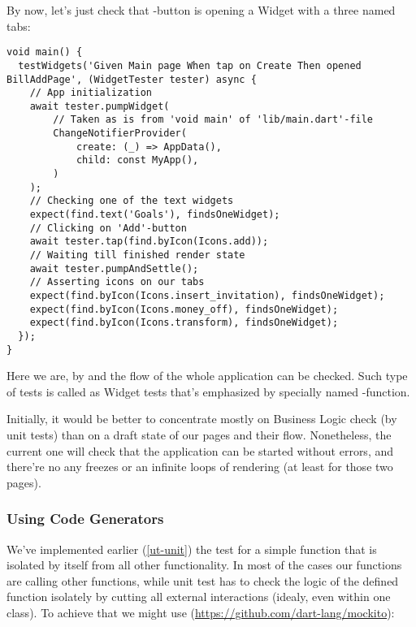\noindent By now, let's just check that -button is opening a Widget with a three named tabs:

\begin{lstlisting}
void main() {
  testWidgets('Given Main page When tap on Create Then opened BillAddPage', (WidgetTester tester) async {
    // App initialization
    await tester.pumpWidget(
        // Taken as is from 'void main' of 'lib/main.dart'-file
        ChangeNotifierProvider(
            create: (_) => AppData(),
            child: const MyApp(),
        )
    );
    // Checking one of the text widgets
    expect(find.text('Goals'), findsOneWidget);
    // Clicking on 'Add'-button
    await tester.tap(find.byIcon(Icons.add));
    // Waiting till finished render state
    await tester.pumpAndSettle();
    // Asserting icons on our tabs
    expect(find.byIcon(Icons.insert_invitation), findsOneWidget);
    expect(find.byIcon(Icons.money_off), findsOneWidget);
    expect(find.byIcon(Icons.transform), findsOneWidget);
  });
}
\end{lstlisting}

\noindent Here we are, by  and  the flow of the whole application can be checked. Such type of tests 
is called as Widget tests that's emphasized by specially named -function.

Initially, it would be better to concentrate mostly on Business Logic check (by unit tests) than on a draft state of 
our pages and their flow. Nonetheless, the current one will check that the application can be started without errors, 
and there're no any freezes or an infinite loops of rendering (at least for those two pages). 


\subsubsection{Using Code Generators} \label{ut-code-generator}

We've implemented earlier (\ref{ut-unit}) the test for a simple function that is isolated by itself from all other 
functionality. In most of the cases our functions are calling other functions, while unit test has to check the logic 
of the defined function isolately by cutting all external interactions (idealy, even within one class). To achieve that 
we might use  (\href{https://github.com/dart-lang/mockito}{https://github.com/dart-lang/mockito}):

